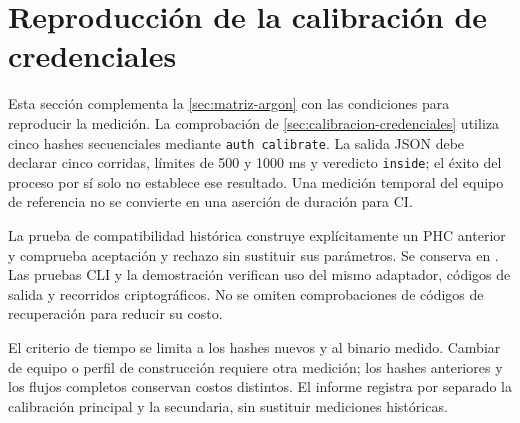 \section{Reproducción de la calibración de credenciales}\label{anexo:calibracion-credenciales}

Esta sección complementa la \cref{sec:matriz-argon} con las condiciones para reproducir la medición. La comprobación de \cref{sec:calibracion-credenciales} utiliza cinco hashes secuenciales mediante \texttt{auth calibrate}. La salida JSON debe declarar cinco corridas, límites de 500 y 1000 ms y veredicto \texttt{inside}; el éxito del proceso por sí solo no establece ese resultado. Una medición temporal del equipo de referencia no se convierte en una aserción de duración para CI.

La prueba de compatibilidad histórica construye explícitamente un PHC anterior y comprueba aceptación y rechazo sin sustituir sus parámetros. Se conserva en . Las pruebas CLI y la demostración verifican uso del mismo adaptador, códigos de salida y recorridos criptográficos. No se omiten comprobaciones de códigos de recuperación para reducir su costo.

El criterio de tiempo se limita a los hashes nuevos y al binario medido. Cambiar de equipo o perfil de construcción requiere otra medición; los hashes anteriores y los flujos completos conservan costos distintos. El informe  registra por separado la calibración principal y la secundaria, sin sustituir mediciones históricas.

